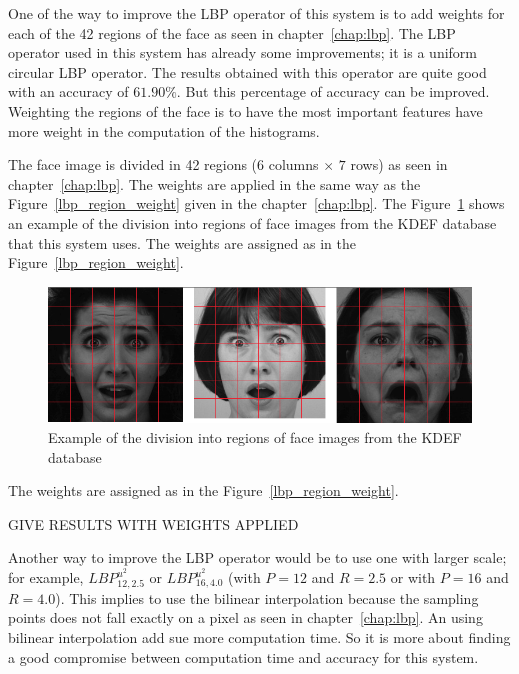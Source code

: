 \vspace{\baselineskip}
\noindent One of the way to improve the LBP operator of this system is to add weights for each of the 42 regions of the face as seen in chapter~\ref{chap:lbp}. The LBP operator used in this system has already some improvements; it is a uniform circular LBP operator. The results obtained with this operator are quite good with an accuracy of $ 61.90\% $. But this percentage of accuracy can be improved. Weighting the regions of the face is to have the most important features have more weight in the computation of the histograms.
\newline

\noindent The face image is divided in 42 regions ($ 6 $ columns $ \times $ $ 7 $ rows) as seen in chapter~\ref{chap:lbp}. The weights are applied in the same way as the Figure~\ref{lbp_region_weight} given in the chapter~\ref{chap:lbp}. The Figure~\ref{implementation_weight_example} shows an example of the division into regions of face images from the KDEF database that this system uses. The weights are assigned as in the Figure~\ref{lbp_region_weight}.
\newline

\begin{figure}[!h]
\begin{center}
\noindent \includegraphics[scale=0.5]{figures/implementation_weight_example} 
\newline
\caption{Example of the division into regions of face images from the KDEF database}
\label{implementation_weight_example}
\end{center} 
\end{figure}

\noindent The weights are assigned as in the Figure~\ref{lbp_region_weight}. 
\newline

\noindent GIVE RESULTS WITH WEIGHTS APPLIED
\newline

\noindent Another way to improve the LBP operator would be to use one with larger scale; for example, $ LBP_{12,2.5}^{u^2} $ or $ LBP_{16,4.0}^{u^2} $ (with $ P = 12 $ and $ R = 2.5 $ or with $ P = 16 $ and $ R = 4.0 $). This implies to use the bilinear interpolation because the sampling points does not fall exactly on a pixel as seen in chapter~\ref{chap:lbp}. An using bilinear interpolation add sue more computation time. So it is more about finding a good compromise between computation time and accuracy for this system.
\newline

